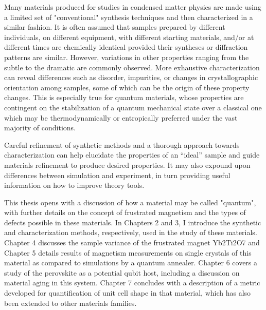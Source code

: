 

Many materials produced for studies in condensed matter physics are made using a limited set of "conventional" synthesis techniques and then characterized in a similar fashion. It is often assumed that samples prepared by different individuals, on different equipment, with different starting materials, and/or at different times are chemically identical provided their syntheses or diffraction patterns are similar. However, variations in other properties ranging from the subtle to the dramatic are commonly observed. More exhaustive characterization can reveal differences such as disorder, impurities, or changes in crystallographic orientation among samples, some of which can be the origin of these property changes. This is especially true for quantum materials, whose properties are contingent on the stabilization of a quantum mechanical state over a classical one which may be thermodynamically or entropically preferred under the vast majority of conditions.

Careful refinement of synthetic methods and a thorough approach towards characterization can help elucidate the properties of an “ideal” sample and guide materials refinement to produce desired properties. It may also expound upon differences between simulation and experiment, in turn providing useful information on how to improve theory tools.

This thesis opens with a discussion of how a material may be called "quantum", with further details on the concept of frustrated magnetism and the types of defects possible in these materials. In Chapters 2 and 3, I introduce the synthetic and characterization methods, respectively, used in the study of these materials. Chapter 4 discusses the sample variance of the frustrated magnet Yb2Ti2O7 and Chapter 5 details results of magnetism measurements on single crystals of this material as compared to simulations by a quantum annealer. Chapter 6 covers a study of the perovskite as a potential qubit host, including a discussion on material aging in this system. Chapter 7 concludes with a description of a metric developed for quantification of unit cell shape in that material, which has also been extended to other materials families.




